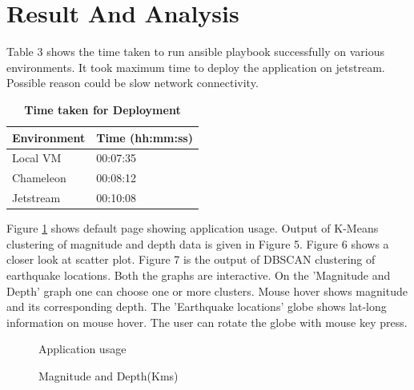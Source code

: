 \documentclass[9pt,twocolumn,twoside]{../../styles/osajnl}
\begin{document}
\section {Result And Analysis}

Table 3 shows the time taken to run ansible playbook successfully on various environments. It took maximum time to deploy the application on jetstream. Possible reason could be slow network connectivity.

\begin{table}[htbp]
\caption{\bf Time taken for Deployment}
\begin{tabular}{ m{6em} m{2.5cm} } 
\hline
Environment & Time (hh:mm:ss) \\ 
\hline
Local VM & 00:07:35 \\ 
Chameleon & 00:08:12 \\
Jetstream & 00:10:08 \\

\hline
\end{tabular}
\end{table} 



Figure \ref{fig:figure1} shows default page showing application usage. Output of K-Means clustering of magnitude and depth data is given in Figure 5. Figure 6 shows a closer look at scatter plot. Figure 7 is the output of DBSCAN clustering of earthquake locations. Both the graphs are interactive. On the 'Magnitude and Depth' graph one can choose one or more clusters. Mouse hover shows magnitude  and its corresponding depth. The 'Earthquake locations' globe shows lat-long information on mouse hover. The user can rotate the globe with mouse key press.


\begin{figure}[htbp]
\centering
{}
\caption{Application usage} 
\label{fig:figure1}
\end{figure}

\begin{figure}[htbp]
\centering
{}
\caption{Magnitude and Depth(Kms)} 
\label{fig:figure5}
\end{figure}
\end{document}
